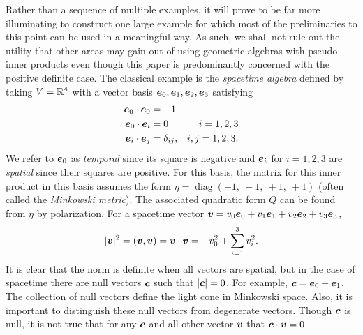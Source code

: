 \documentclass{article}
\begin{document}
\begin{example}
Rather than a sequence of multiple examples, it will prove to be far more illuminating to construct one large example for which most of the preliminaries to this point can be used in a meaningful way. As such, we shall not rule out the utility that other areas may gain out of using geometric algebras with pseudo inner products even though this paper is predominantly concerned with the positive definite case. The classical example is the \emph{spacetime algebra} defined by taking $V=\mathbb{R}^4$ with a vector basis $\boldsymbol{e}_0,\boldsymbol{e}_1,\boldsymbol{e}_2,\boldsymbol{e}_3$ satisfying
\begin{subequations}
\begin{align}
\boldsymbol{e}_0 \cdot \boldsymbol{e}_0 &= -1\\
\boldsymbol{e}_0 \cdot \boldsymbol{e}_i &= 0  &i=1,2,3\\
\boldsymbol{e}_i \cdot \boldsymbol{e}_j &= \delta_{ij}, &i,j=1,2,3.
\end{align}
\end{subequations}
We refer to $\boldsymbol{e}_0$ as \emph{temporal} since its square is negative and $\boldsymbol{e}_i$ for $i=1,2,3$ are \emph{spatial} since their squares are positive. For this basis, the matrix for this inner product in this basis assumes the form $\eta =\operatorname{diag}(-1,~ +1,~ +1,~+1)$ (often called the \emph{Minkowski metric}). The associated quadratic form $Q$ can be found from $\eta$ by polarization. For a spacetime vector $\boldsymbol{v} = v_0 \boldsymbol{e}_0 +v_1 \boldsymbol{e}_1 + v_2 \boldsymbol{e}_2 + v_3 \boldsymbol{e}_3$,
\begin{equation}
\label{eq:spacetime_inner_product}
|\boldsymbol{v}|^2 = (\boldsymbol{v},\boldsymbol{v}) = \boldsymbol{v} \cdot \boldsymbol{v} = -v_0^2 + \sum_{i=1}^3 v_i^2.
\end{equation}
It is clear that the norm is definite when all vectors are spatial, but in the case of spacetime there are null vectors $\boldsymbol{c}$ such that $|\boldsymbol{c}|=0$. For example, $\boldsymbol{c}=\boldsymbol{e}_0 + \boldsymbol{e}_1$. The collection of null vectors define the light cone in Minkowski space. Also, it is important to distinguish these null vectors from degenerate vectors. Though $\boldsymbol{c}$ is null, it is not true that for any $\boldsymbol{c}$ and all other vector $\boldsymbol{v}$ that $\boldsymbol{c} \cdot \boldsymbol{v}=0$.


\end{example}
\end{document}
